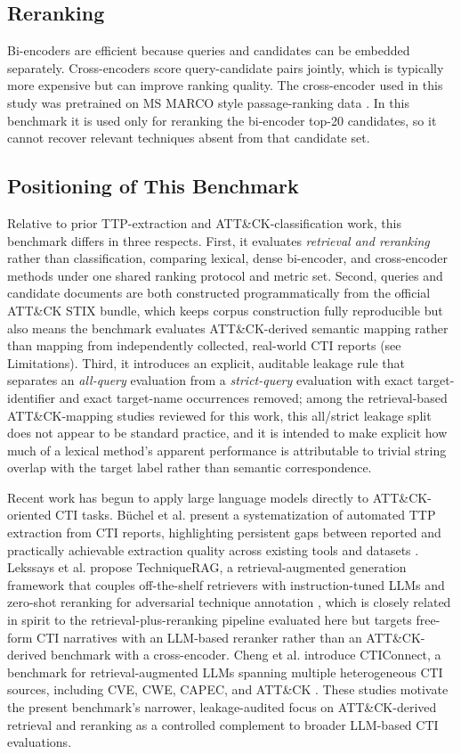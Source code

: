 \documentclass[conference]{IEEEtran}
\begin{document}
\subsection{Reranking}
Bi-encoders are efficient because queries and candidates can be embedded separately. Cross-encoders score query-candidate pairs jointly, which is typically more expensive but can improve ranking quality. The cross-encoder used in this study was pretrained on MS MARCO style passage-ranking data \cite{bajaj2016msmarco}. In this benchmark it is used only for reranking the bi-encoder top-20 candidates, so it cannot recover relevant techniques absent from that candidate set.

\subsection{Positioning of This Benchmark}
Relative to prior TTP-extraction and ATT\&CK-classification work, this benchmark differs in three respects. First, it evaluates \emph{retrieval and reranking} rather than classification, comparing lexical, dense bi-encoder, and cross-encoder methods under one shared ranking protocol and metric set. Second, queries and candidate documents are both constructed programmatically from the official ATT\&CK STIX bundle, which keeps corpus construction fully reproducible but also means the benchmark evaluates ATT\&CK-derived semantic mapping rather than mapping from independently collected, real-world CTI reports (see Limitations). Third, it introduces an explicit, auditable leakage rule that separates an \emph{all-query} evaluation from a \emph{strict-query} evaluation with exact target-identifier and exact target-name occurrences removed; among the retrieval-based ATT\&CK-mapping studies reviewed for this work, this all/strict leakage split does not appear to be standard practice, and it is intended to make explicit how much of a lexical method's apparent performance is attributable to trivial string overlap with the target label rather than semantic correspondence.

Recent work has begun to apply large language models directly to ATT\&CK-oriented CTI tasks. B\"uchel et al. present a systematization of automated TTP extraction from CTI reports, highlighting persistent gaps between reported and practically achievable extraction quality across existing tools and datasets \cite{buchel2025sok}. Lekssays et al. propose TechniqueRAG, a retrieval-augmented generation framework that couples off-the-shelf retrievers with instruction-tuned LLMs and zero-shot reranking for adversarial technique annotation \cite{lekssays2025techniquerag}, which is closely related in spirit to the retrieval-plus-reranking pipeline evaluated here but targets free-form CTI narratives with an LLM-based reranker rather than an ATT\&CK-derived benchmark with a cross-encoder. Cheng et al. introduce CTIConnect, a benchmark for retrieval-augmented LLMs spanning multiple heterogeneous CTI sources, including CVE, CWE, CAPEC, and ATT\&CK \cite{cheng2025cticonnect}. These studies motivate the present benchmark's narrower, leakage-audited focus on ATT\&CK-derived retrieval and reranking as a controlled complement to broader LLM-based CTI evaluations.
\end{document}
